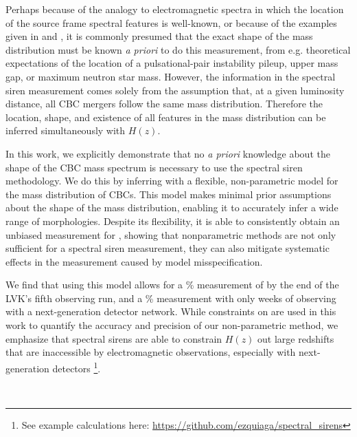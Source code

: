 \documentclass[]{aastex631}
\begin{document}
Perhaps because of the analogy to electromagnetic spectra in which the location of the source frame spectral features is well-known, or because of the examples given in \cite{farr_future_2019} and \cite{chernoff+fin}, it is commonly presumed that the exact shape of the mass distribution must be known \emph{a priori} to do this measurement, from e.g. theoretical expectations of the location of a pulsational-pair instability pileup, upper mass gap, or maximum neutron star mass.
However, the information in the spectral siren measurement comes solely from the assumption that, at a given luminosity distance, all CBC mergers follow the same mass distribution.
Therefore the location, shape, and existence of all features in the mass distribution can be inferred simultaneously with $H(z)$.

In this work, we explicitly demonstrate that no \emph{a priori} knowledge about the shape of the CBC mass spectrum is necessary to use the spectral siren methodology. 
We do this by inferring \Ho with a flexible, non-parametric model for the mass distribution of CBCs. 
This model makes minimal prior assumptions about the shape of the mass distribution, enabling it to accurately infer a wide range of morphologies.
Despite its flexibility, it is able to consistently obtain an unbiased measurement for \Ho, showing that nonparametric methods are not only sufficient for a spectral siren measurement, they can also mitigate systematic effects in the measurement caused by model misspecification.

We find that using this model allows for a \% measurement of \Ho by the end of the LVK's fifth observing run, and a \% measurement with only  weeks of observing with a next-generation detector network. 
While constraints on \Ho are used in this work to quantify the accuracy and precision of our non-parametric method, we emphasize that spectral sirens are able to constrain $H(z)$ out large redshifts that are inaccessible by electromagnetic observations, especially with next-generation detectors \citep{ezquiaga_spectral_2022, Chen:2024gdn}\footnote{See example calculations here: \href{https://github.com/ezquiaga/spectral_sirens}{https://github.com/ezquiaga/spectral\_sirens}}.

\\ 
\end{document}
